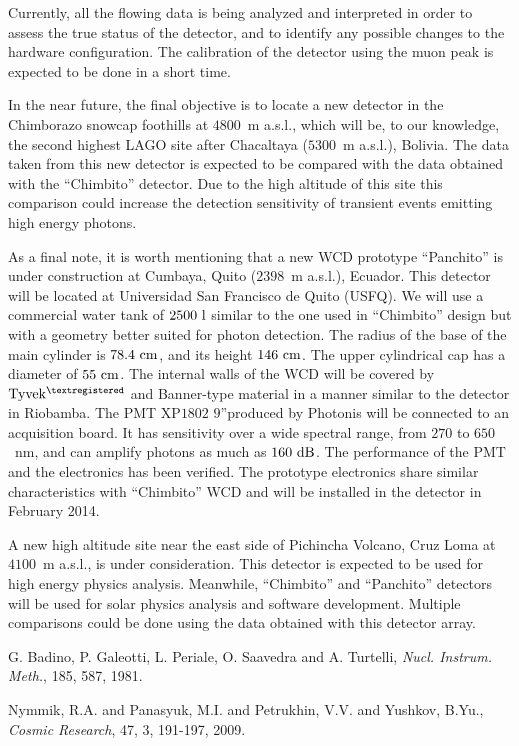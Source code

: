 \documentclass[12pt]{article}
\begin{document}
Currently, all the flowing data is being analyzed and interpreted in order to assess the true status of the detector, and to identify any possible changes to the hardware configuration. The calibration of the detector using the muon peak is expected to be done in a short time.

In the near future, the final objective is to locate a new detector in the
Chimborazo snowcap foothills at $4800$~m a.s.l., which will be, to our
knowledge, the second highest LAGO site after Chacaltaya ($5300$~m a.s.l.),
Bolivia. The data taken from this new detector is expected to be compared
with the data obtained with the ``Chimbito'' detector. Due to the high altitude of this site  this comparison could increase the detection sensitivity of transient events emitting high energy photons.

As a final note, it is worth mentioning that a new WCD prototype
``Panchito'' is under construction at Cumbaya, Quito ($2398$~m a.s.l.),
Ecuador. This detector will be located at Universidad San Francisco de
Quito (USFQ). We will use a commercial water tank of ${2500\ {\rm l}}$
similar to the one used in ``Chimbito'' design but with a geometry better
suited for photon detection. The radius of the base of the main cylinder is
$78.4\ {\rm cm}$, and its height $146\ {\rm cm}$. The upper cylindrical cap
has a diameter of $55\ {\rm cm}$. The internal walls of the WCD will be
covered by ${{\rm Tyvek^{\tiny \textregistered}}}$ and Banner-type material
in a manner similar to the detector in Riobamba. The PMT XP$1802$ $9$''produced by Photonis will be connected to an acquisition board. It has sensitivity over a wide spectral range, from $270$ to $650$~nm, and can amplify photons as much as ${160\ {\rm dB}}$. The performance of the PMT and the electronics has been verified. The prototype electronics share similar characteristics with ``Chimbito'' WCD and will be installed in the detector in February 2014.

A new high altitude site near the east side of Pichincha Volcano, Cruz Loma at $4100$~m a.s.l., is under consideration. This detector is expected to be used for high energy physics analysis. Meanwhile, ``Chimbito'' and ``Panchito'' detectors will be used for solar physics analysis and software development. Multiple comparisons could be done using the data obtained with this detector array.

\begin{thebibliography}{}
 G. Badino, P. Galeotti, L. Periale, O. Saavedra and A. Turtelli, \emph{Nucl. Instrum. Meth.}, 185, 587, 1981.

 Nymmik, R.A. and Panasyuk, M.I. and Petrukhin, V.V. and Yushkov, B.Yu., \emph{Cosmic Research}, 47, 3, 191-197, 2009.
\end{thebibliography}
\end{document}
